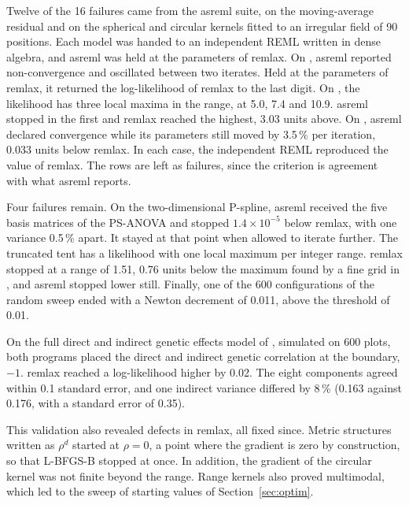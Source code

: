 \documentclass[article,nojss]{jss}
\renewcommand{\pkg}[1]{#1}
\begin{document}
Twelve of the 16 failures came from the \pkg{asreml} suite, on the moving-average
residual  and on the spherical and circular kernels fitted to an
irregular field of 90 positions. Each model was handed to an independent
REML written in dense  algebra, and \pkg{asreml} was held at the
parameters of \pkg{remlax}. On , \pkg{asreml} reported
non-convergence and oscillated between two iterates. Held at the parameters
of \pkg{remlax}, it returned the log-likelihood of \pkg{remlax} to the last
digit. On , the likelihood has three local maxima in the range, at
5.0, 7.4 and 10.9. \pkg{asreml} stopped in the first and \pkg{remlax} reached
the highest, 3.03 units above. On , \pkg{asreml} declared
convergence while its parameters still moved by 3.5\,\% per iteration, 0.033
units below \pkg{remlax}. In each case, the independent REML reproduced the
value of \pkg{remlax}. The rows are left as failures, since the criterion is
agreement with what \pkg{asreml} reports.

Four failures remain. On the two-dimensional P-spline, \pkg{asreml} received
the five basis matrices of the PS-ANOVA and stopped $1.4 \times 10^{-5}$
below \pkg{remlax}, with one variance 0.5\,\% apart. It stayed at that point
when allowed to iterate further. The truncated tent  has a
likelihood with one local maximum per integer range. \pkg{remlax} stopped at
a range of 1.51, 0.76 units below the maximum found by a fine grid in
, and \pkg{asreml} stopped lower still. Finally, one of the 600
configurations of the random sweep ended with a Newton decrement of 0.011,
above the threshold of 0.01.

On the full direct and indirect genetic effects model of \citet{salas2026},
simulated on 600 plots, both programs placed the direct and indirect genetic
correlation at the boundary, $-1$. \pkg{remlax} reached a log-likelihood
higher by 0.02. The eight components agreed within 0.1 standard error, and
one indirect variance differed by 8\,\% (0.163 against 0.176, with a standard
error of 0.35).

This validation also revealed defects in \pkg{remlax}, all fixed since.
Metric structures written as $\rho^d$ started at $\rho = 0$, a point where
the gradient is zero by construction, so that L-BFGS-B stopped at once. In
addition, the gradient of the circular kernel was not finite beyond the range.
Range kernels also proved multimodal, which led to the sweep of starting
values of Section~\ref{sec:optim}.
\end{document}
